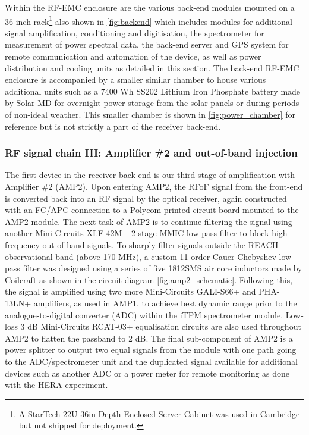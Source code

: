 Within the RF-EMC enclosure are the various back-end modules mounted on a 36-inch rack\footnote{A StarTech 22U 36in Depth Enclosed Server Cabinet was used in Cambridge but not shipped for deployment.} also shown in \cref{fig:backend} which includes modules for additional signal amplification, conditioning and digitisation, the spectrometer for measurement of power spectral data, the back-end server and GPS system for remote communication and automation of the device, as well as power distribution and cooling units as detailed in this section. The back-end RF-EMC enclosure is accompanied by a smaller similar chamber to house various additional units such as a 7400 Wh SS202 Lithium Iron Phosphate battery made by Solar MD for overnight power storage from the solar panels or during periods of non-ideal weather. This smaller chamber is shown in \cref{fig:power_chamber} for reference but is not strictly a part of the receiver back-end.


\subsubsection{RF signal chain III: Amplifier \#2 and out-of-band injection}
The first device in the receiver back-end is our third stage of amplification with Amplifier \#2 (AMP2). Upon entering AMP2, the RFoF signal from the front-end is converted back into an RF signal by the optical receiver, again constructed with an FC/APC connection to a Polycom printed circuit board mounted to the AMP2 module. The next task of AMP2 is to continue filtering the signal using another Mini-Circuits XLF-42M+ 2-stage MMIC low-pass filter to block high-frequency out-of-band signals. To sharply filter signals outside the REACH observational band (above 170 MHz), a custom 11-order Cauer Chebyshev low-pass filter was designed using a series of five 1812SMS air core inductors made by Coilcraft as shown in the circuit diagram \cref{fig:amp2_schematic}. Following this, the signal is amplified using two more Mini-Circuits GALI-S66+ and PHA-13LN+ amplifiers, as used in AMP1, to achieve best dynamic range prior to the analogue-to-digital converter (ADC) within the iTPM spectrometer module. Low-loss 3 dB Mini-Circuits RCAT-03+ equalisation circuits are also used throughout AMP2 to flatten the passband to 2 dB. The final sub-component of AMP2 is a power splitter to output two equal signals from the module with one path going to the ADC/spectrometer unit and the duplicated signal available for additional devices such as another ADC or a power meter for remote monitoring as done with the HERA experiment.

